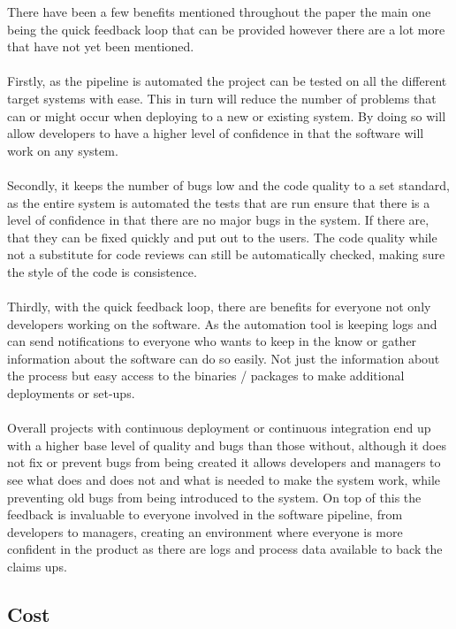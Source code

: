 There have been a few benefits mentioned throughout the paper the main one being the quick feedback loop that can be provided however there are a lot more that have not yet been mentioned.
\\\\
Firstly, as the pipeline is automated the project can be tested on all the different target systems with ease. This in turn will reduce the number of problems that can or might occur when deploying to a new or existing system. By doing so will allow developers to have a higher level of confidence in that the software will work on any system.
\\\\
Secondly, it keeps the number of bugs low and the code quality to a set standard,  as the entire system is automated the tests that are run ensure that there is a level of confidence in that there are no major bugs in the system. If there are, that they can be fixed quickly and put out to the users. The code quality while not a substitute for code reviews can still be automatically checked, making sure the style of the code is consistence. 
\\\\
Thirdly, with the quick feedback loop, there are benefits for everyone not only developers working on the software. As the automation tool is keeping logs and can send notifications to everyone who wants to keep in the know or gather information about the software can do so easily. Not just the information about the process but easy access to the binaries / packages to make additional deployments or set-ups.
\\\\
Overall projects with continuous deployment or continuous integration end up with a higher base level of quality and bugs than those without, although it does not fix or prevent bugs from being created it allows developers and managers to see what does and does not and what is needed to make the system work, while preventing old bugs from being introduced to the system. On top of this the feedback is invaluable to everyone involved in the software pipeline, from developers to managers, creating an environment where everyone is more confident in the product as there are logs and process data available to back the claims ups.


\subsection{Cost}

